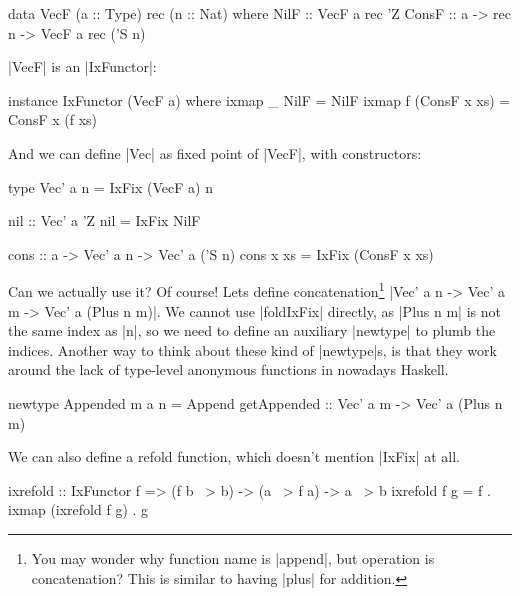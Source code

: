 \begin{code}
data VecF (a :: Type) rec (n :: Nat) where
    NilF  ::               VecF a rec 'Z
    ConsF :: a -> rec n -> VecF a rec ('S n)
\end{code}

|VecF| is an |IxFunctor|:

\begin{code}
instance IxFunctor (VecF a) where
    ixmap _ NilF         = NilF
    ixmap f (ConsF x xs) = ConsF x (f xs)
\end{code}

And we can define |Vec| as fixed point of |VecF|, with constructors:

\begin{code}
type Vec' a n = IxFix (VecF a) n

nil :: Vec' a 'Z
nil = IxFix NilF

cons :: a -> Vec' a n -> Vec' a ('S n)
cons x xs = IxFix (ConsF x xs)
\end{code}

Can we actually use it? Of course!
Lets define concatenation\footnote{You may wonder why function name is |append|, but operation is concatenation? This is similar to having |plus| for addition.}
|Vec' a n -> Vec' a m -> Vec' a (Plus n m)|.
We cannot use |foldIxFix| directly, as |Plus n m| is not the same
index as |n|, so we need to define an auxiliary |newtype|
to plumb the indices. Another way to think about these kind of |newtype|s,
is that they work around the lack of type-level anonymous functions in nowadays Haskell.

\begin{code}
newtype Appended m a n =
    Append { getAppended :: Vec' a m -> Vec' a (Plus n m) }
\end{code}


We can also define a refold function, which doesn't mention
|IxFix| at all.

\begin{code}
ixrefold :: IxFunctor f => (f b ~> b) -> (a ~> f a) -> a ~> b
ixrefold f g = f . ixmap (ixrefold f g) . g
\end{code}

